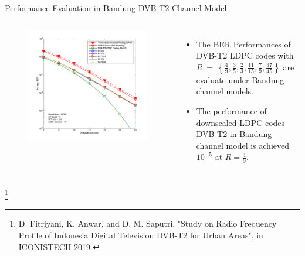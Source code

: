 \documentclass[11pt, aspectratio=169]{beamer}
\newcommand\blfootnote[1]{%
  \begingroup
  \renewcommand\thefootnote{}\footnote{#1}%
  \addtocounter{footnote}{-1}%
  \endgroup
}
\begin{document}
\begin{frame}{Performance Evaluation in Bandung DVB-T2 Channel Model}
\begin{columns}

\vspace{-25pt}
\begin{figure}
\centering 
\includegraphics[scale=0.5]{gambarafa/coded-2}

\label{fading} %
\end{figure}
\begin{itemize}

\justifying
\item The BER Performances of DVB-T2 LDPC codes with $R~=~\left \{ \frac{4}{9}, \frac{3}{5}, \frac{2}{3},\frac{11}{15},\frac{7}{9},\frac{37}{45} \right \}$ are evaluate under Bandung channel models\footnotemark[1].
\item The performance of downscaled LDPC codes DVB-T2 in Bandung channel model is achieved $10^{-5}$ at $R=\frac{4}{9}$.

\end{itemize}
\end{columns}
\blfootnote{\tiny{D. Fitriyani, K. Anwar, and D. M. Saputri, "Study on Radio Frequency Profile of Indonesia Digital Television DVB-T2 for Urban Areas", in ICONISTECH 2019.}}

\end{frame}
\end{document}
